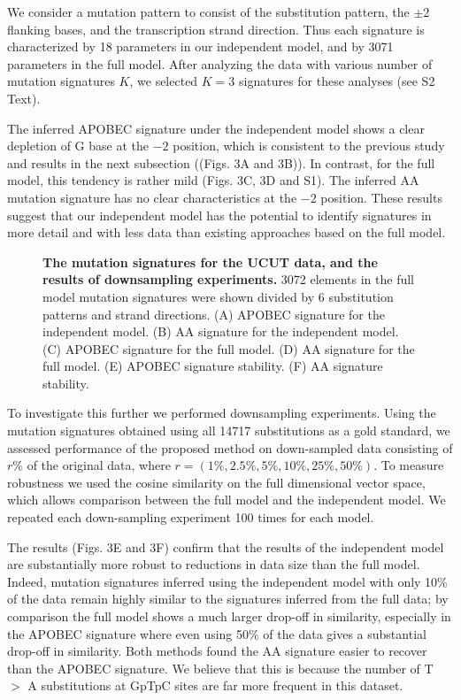 \documentclass[10pt,letterpaper]{article}
\begin{document}
We consider a mutation pattern to consist of the substitution pattern, the $\pm 2$ flanking bases, and the transcription strand direction. Thus each signature is characterized by 18 parameters in our independent model, and by 3071 parameters in the full model. After analyzing the data with various number of mutation signatures $K$,
we selected $K=3$ signatures for these analyses (see S2 Text).


The inferred APOBEC signature under the independent model
shows a clear depletion of G base at the $-2$ position,
which is consistent to the previous study \cite{pmid23318258} and results in the next subsection ((Figs. 3A and 3B)).
In contrast, for the full model, this tendency is rather mild (Figs. 3C, 3D and S1).
The inferred AA mutation signature has no clear characteristics at the $-2$ position.
These results suggest that our independent model has the potential
to identify signatures in more detail and with less data than existing approaches based on the full model.

\begin{figure}[h]
\caption{{\bf The mutation signatures for the UCUT data, and the results of downsampling experiments.}
3072 elements in the full model mutation signatures were shown divided by 6 substitution patterns and strand directions.
(A) APOBEC signature for the independent model.
(B) AA signature for the independent model.
(C) APOBEC signature for the full model.
(D) AA signature for the full model.
(E) APOBEC signature stability.
(F) AA signature stability.}
\label{UCUT}
\end{figure}

To investigate this further we performed downsampling experiments.
Using the mutation signatures obtained using all 14717 substitutions as a gold standard, 
we assessed performance of the proposed method on down-sampled data consisting of $r\%$ of the original data, where  $r=(1\%, 2.5\%, 5\%, 10\%, 25\%, 50\%)$.
To measure robustness we used the cosine similarity on the 
full dimensional vector space, which allows comparison between the full model and the independent model.
We repeated each down-sampling experiment 100 times for each model.


The results (Figs. 3E and 3F)
confirm that the results of the independent model 
are substantially more robust to reductions in data size than the full model. Indeed, mutation signatures inferred using the independent model with only 10\% of the data 
remain highly similar to the signatures inferred from the full data; by comparison the full model shows a much larger drop-off in similarity, especially in the APOBEC signature where even using 50\% of the data gives a substantial drop-off in similarity. Both methods found the AA signature 
easier to recover than the APOBEC signature.
We believe that this is because the number of T $>$ A substitutions at GpTpC sites are far more frequent in this dataset.
\end{document}
